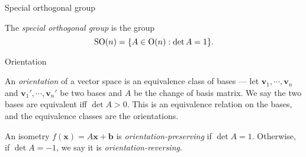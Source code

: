 \begin{frame}{Special orthogonal group}
    \begin{defi}
      The \emph{special orthogonal group} is the group
      \[
        \mathrm{SO}(n) = \{A \in \mathrm{O}(n):\det A = 1\}.
      \]
    \end{defi}
\end{frame}

\begin{frame}{Orientation}
    \begin{defi}[Orientation]
      An \emph{orientation} of a vector space is an equivalence class of bases --- let $\mathbf{v}_1, \cdots, \mathbf{v}_n$ and $\mathbf{v}_1', \cdots, \mathbf{v}_n'$ be two bases and $A$ be the change of basis matrix. We say the two bases are equivalent iff $\det A > 0$. This is an equivalence relation on the bases, and the equivalence classes are the orientations.
    \end{defi}

    \begin{defi}
      An isometry $f(\mathbf{x}) = A\mathbf{x} + \mathbf{b}$ is \emph{orientation-preserving} if $\det A = 1$. Otherwise, if $\det A = -1$, we say it is \emph{orientation-reversing}.
    \end{defi}
\end{frame}